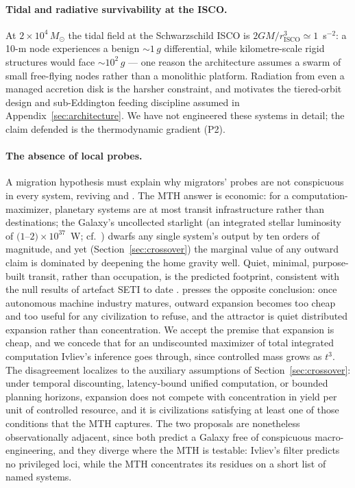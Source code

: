 \documentclass[11pt]{article}
\newcommand{\msun}{\ensuremath{M_\odot}}
\begin{document}
\paragraph{Tidal and radiative survivability at the ISCO.} At $2\times10^{4}\,\msun$ the tidal field at the Schwarzschild ISCO is $2GM/r_{\mathrm{ISCO}}^{3} \simeq 1$~s$^{-2}$: a 10-m node experiences a benign $\sim$$1\,g$ differential, while kilometre-scale rigid structures would face $\sim$$10^{2}\,g$ --- one reason the architecture assumes a swarm of small free-flying nodes rather than a monolithic platform. Radiation from even a managed accretion disk is the harsher constraint, and motivates the tiered-orbit design and sub-Eddington feeding discipline assumed in Appendix~\ref{sec:architecture}. We have not engineered these systems in detail; the claim defended is the thermodynamic gradient (P2).

\paragraph{The absence of local probes.} A migration hypothesis must explain why migrators' probes are not conspicuous in every system, reviving \citet{Hart1975} and \citet{Tipler1980}. The MTH answer is economic: for a computation-maximizer, planetary systems are at most transit infrastructure rather than destinations; the Galaxy's uncollected starlight (an integrated stellar luminosity of $(1$--$2)\times10^{37}$~W; cf.~\citealt{Flynn2006}) dwarfs any single system's output by ten orders of magnitude, and yet (Section~\ref{sec:crossover}) the marginal value of any outward claim is dominated by deepening the home gravity well. Quiet, minimal, purpose-built transit, rather than occupation, is the predicted footprint, consistent with the null results of artefact SETI to date \citep{Wright2022}. \citet{Ivliev2026} presses the opposite conclusion: once autonomous machine industry matures, outward expansion becomes too cheap and too useful for any civilization to refuse, and the attractor is quiet distributed expansion rather than concentration. We accept the premise that expansion is cheap, and we concede that for an undiscounted maximizer of total integrated computation Ivliev's inference goes through, since controlled mass grows as $t^{3}$. The disagreement localizes to the auxiliary assumptions of Section~\ref{sec:crossover}: under temporal discounting, latency-bound unified computation, or bounded planning horizons, expansion does not compete with concentration in yield per unit of controlled resource, and it is civilizations satisfying at least one of those conditions that the MTH captures. The two proposals are nonetheless observationally adjacent, since both predict a Galaxy free of conspicuous macro-engineering, and they diverge where the MTH is testable: Ivliev's filter predicts no privileged loci, while the MTH concentrates its residues on a short list of named systems.
\end{document}
